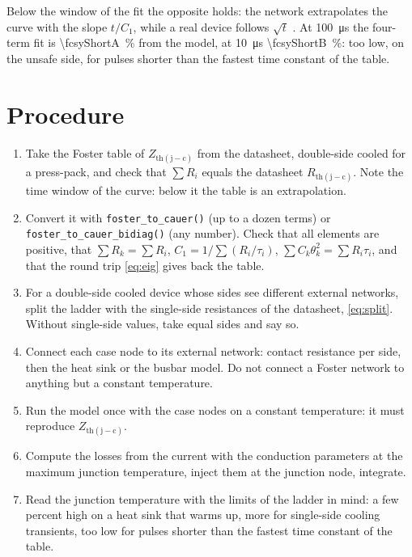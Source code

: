 \documentclass[10pt,a4paper]{scrartcl}
\newcommand{\Zjc}{Z_\mathrm{th(j-c)}}
\newcommand{\Rjc}{R_\mathrm{th(j-c)}}
\newcommand{\code}[1]{\texttt{#1}}
\begin{document}
Below the window of the fit the opposite holds: the network extrapolates the curve with the slope $t/C_1$, while a real device follows $\sqrt{t}$ \cite{activeclamping}. At \SI{100}{\micro\second} the four-term fit is \SI{\fcsyShortA}{\percent} from the model, at \SI{10}{\micro\second} \SI{\fcsyShortB}{\percent}: too low, on the unsafe side, for pulses shorter than the fastest time constant of the table.

\section{Procedure}
\label{sec:procedure}
\begin{enumerate}
\item Take the Foster table of $\Zjc$ from the datasheet, double-side cooled for a press-pack, and check that $\sum R_i$ equals the datasheet $\Rjc$. Note the time window of the curve: below it the table is an extrapolation.
\item Convert it with \code{foster\_to\_cauer()} (up to a dozen terms) or \code{foster\_to\_cauer\_bidiag()} (any number). Check that all elements are positive, that $\sum R_k = \sum R_i$, $C_1 = 1/\sum (R_i/\tau_i)$, $\sum C_k\theta_k^2 = \sum R_i\tau_i$, and that the round trip \eqref{eq:eig} gives back the table.
\item For a double-side cooled device whose sides see different external networks, split the ladder with the single-side resistances of the datasheet, \eqref{eq:split}. Without single-side values, take equal sides and say so.
\item Connect each case node to its external network: contact resistance per side, then the heat sink or the busbar model. Do not connect a Foster network to anything but a constant temperature.
\item Run the model once with the case nodes on a constant temperature: it must reproduce $\Zjc$.
\item Compute the losses from the current with the conduction parameters at the maximum junction temperature, inject them at the junction node, integrate.
\item Read the junction temperature with the limits of the ladder in mind: a few percent high on a heat sink that warms up, more for single-side cooling transients, too low for pulses shorter than the fastest time constant of the table.
\end{enumerate}
\end{document}
